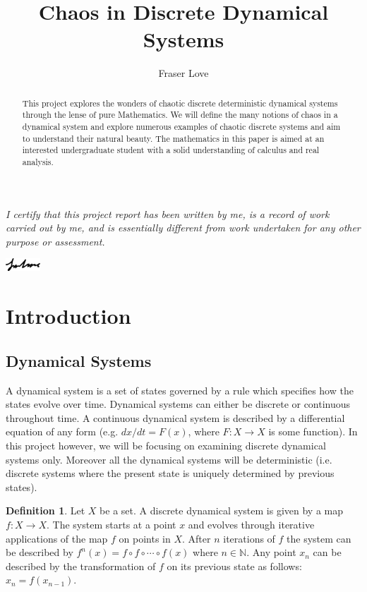 \documentclass[11pt]{article}
\title{Chaos in Discrete Dynamical Systems}
\author{Fraser Love}
\theoremstyle{definition}
\newtheorem{definition}{Definition}[section]
\begin{document}
\maketitle

\noindent\textit{I certify that this project report has been written by me, is a record of work carried out by me, and is essentially different from work undertaken for any other purpose or assessment.}

\vspace{0.1cm}\hspace{13.1cm}\includegraphics[width=1.3cm]{signature}

\begin{abstract}
    \noindent This project explores the wonders of chaotic discrete deterministic dynamical systems through the lense of pure Mathematics. We will define the many notions of chaos in a dynamical system and explore numerous examples of chaotic discrete systems and aim to understand their natural beauty. The mathematics in this paper is aimed at an interested undergraduate student with a solid understanding of calculus and real analysis.
\end{abstract}

\tableofcontents

\section{Introduction}
\subsection{Dynamical Systems}
A dynamical system is a set of states governed by a rule which specifies how the states evolve over time. Dynamical systems can either be discrete or continuous throughout time. A continuous dynamical system is described by a differential equation of any form (e.g. $dx/dt = F(x)$, where $F: X \to X$ is some function). In this project however, we will be focusing on examining discrete dynamical systems only. Moreover all the dynamical systems will be deterministic (i.e. discrete systems where the present state is uniquely determined by previous states). \cite{devaney} \cite{ruette} \cite{asy} \cite{cobweb}

\begin{definition}
    Let $X$ be a set. A discrete dynamical system is given by a map $f : X \to X$. The system starts at a point $x$ and evolves through iterative applications of the map $f$ on points in $X$. After $n$ iterations of $f$ the system can be described by $f^n(x) = f \circ f \circ \cdots \circ f(x)$ where $n \in \mathbb{N}$. Any point $x_n$ can be described by the transformation of $f$ on its previous state as follows: $x_n = f(x_{n-1})$. 
\end{definition}
\end{document}
